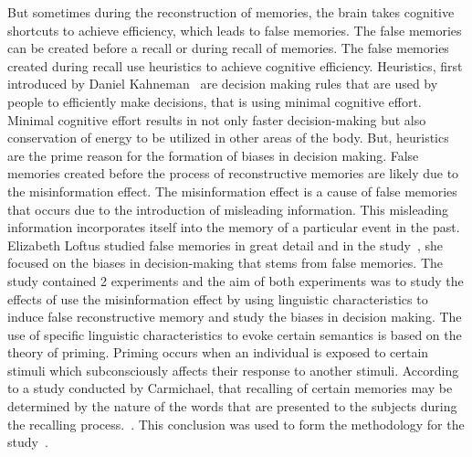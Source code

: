 \documentclass[11pt]{article}
\begin{document}
But sometimes during the reconstruction of memories, the brain takes cognitive shortcuts to achieve efficiency, which leads to false memories. The false memories can be created before a recall or during recall of memories. The false memories created during recall use heuristics to achieve cognitive efficiency. Heuristics, first introduced by Daniel Kahneman~\autocite{Kahneman1974} are decision making rules that are used by people to efficiently make decisions, that is using minimal cognitive effort.
Minimal cognitive effort results in not only faster decision-making but also conservation of energy to be utilized in other areas of the body. But, heuristics are the prime reason for the formation of biases in decision making.
False memories created before the process of reconstructive memories are likely due to the misinformation effect. The misinformation effect is a cause of false memories that occurs due to the introduction of misleading information. This misleading information incorporates itself into the memory of a particular event in the past.
Elizabeth Loftus studied false memories in great detail and in the study~\autocite{loftus1974}, she focused on the biases in decision-making that stems from false memories. The study contained 2 experiments and the aim of both experiments was to study the effects of use the misinformation effect by using linguistic characteristics to induce false reconstructive memory and study the biases in decision making.
The use of specific linguistic characteristics to evoke certain semantics is based on the theory of priming.
Priming occurs when an individual is exposed to certain stimuli which subconsciously affects their response to another stimuli. According to a study conducted by Carmichael, that recalling of certain memories may be determined by the nature of the words that are presented to the subjects during the recalling process.~\autocite{carmichael1932}.
This conclusion was used to form the methodology for the study~\autocite{loftus1974}. 
\end{document}
